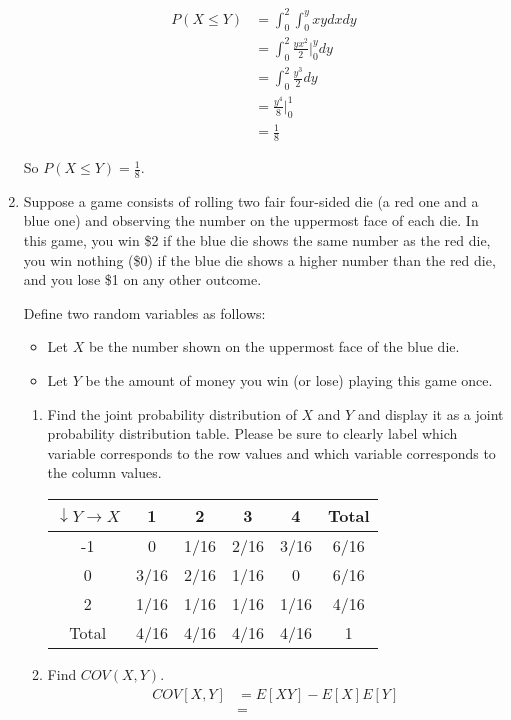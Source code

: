 \documentclass{article}
\begin{document}
\begin{enumerate}
\begin{align*} 
    P(X\leq Y) &= \int_{0}^{2}\int_{0}^{y}xydxdy\\
    &= \int_{0}^{2}\frac{yx^2}{2}|^{y}_{0}dy\\
    &=\int_{0}^{2}\frac{y^3}{2}dy\\
    &=\frac{y^4}{8}|^{1}_{0}\\
    &=\frac{1}{8}
\end{align*}

So $P(X\leq Y)=\frac{1}{8}$.

\item Suppose a game consists of rolling two fair four-sided die (a red one and a blue one)
and observing the number on the uppermost face of each die. In this game, you win \$2
if the blue die shows the same number as the red die, you win nothing (\$0) if the blue
die shows a higher number than the red die, and you lose \$1 on any other outcome.

Define two random variables as follows:
\begin{itemize}
\item Let $X$ be the number shown on the uppermost face of the blue die.
\item Let $Y$ be the amount of money you win (or lose) playing this game once.
\end{itemize}
\begin{enumerate}[label= (\alph*)] 
 \item Find the joint probability distribution of $X$ and $Y$ and display it as a joint probability
distribution table. Please be sure to clearly label which variable corresponds to the
row values and which variable corresponds to the column values.
\begin{center}
    \begin{tabular}{|c|c|c|c|c|c|}
        \hline
        $\downarrow Y\rightarrow X$ &1&2&3&4&Total\\
        \hline
        -1&0&1/16&2/16&3/16&6/16\\
        \hline
        0&3/16&2/16&1/16&0&6/16\\
        \hline
        2&1/16&1/16&1/16&1/16&4/16\\
        \hline
        Total & 4/16 &4/16&4/16&4/16&1\\
        \hline
    \end{tabular}
\end{center}
\item Find $COV(X, Y)$.
\begin{align*} 
    COV[X,Y]&=E[XY]-E[X]E[Y]\\
    &=
\end{align*}
\end{enumerate} 
\iffalse
Problem 5
At a health clinic, the wait time to see a doctor is known to follow an exponential
distribution with 𝛽 = 20.34 minutes. A receptionist at the clinic observes 14 patients and
records the waiting time (in minutes) for each of them.
1. Let 𝑥̅ represent the average waiting time of the 14 patients observed by the
receptionist. Describe the distribution of 𝑥̅ .
2. What is the probability that the average waiting time of the 14 patients is between 15
minutes and 20 minutes?
\fi
\end{enumerate}
\end{document}
